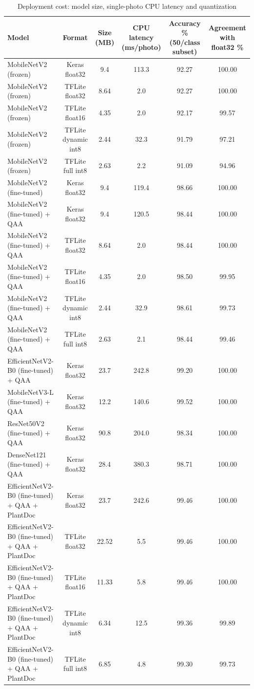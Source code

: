 \begin{table}[t]
\centering
\small
\caption{Deployment cost: model size, single-photo CPU latency and quantization}
\label{tab:table_deployment}
\begin{tabular}{lccccc}
\toprule
Model & Format & Size (MB) & CPU latency (ms/photo) & Accuracy \% (50/class subset) & Agreement with float32 \% \\
\midrule
MobileNetV2 (frozen) & Keras float32 & 9.4 & 113.3 & 92.27 & 100.00 \\
MobileNetV2 (frozen) & TFLite float32 & 8.64 & 2.0 & 92.27 & 100.00 \\
MobileNetV2 (frozen) & TFLite float16 & 4.35 & 2.0 & 92.17 & 99.57 \\
MobileNetV2 (frozen) & TFLite dynamic int8 & 2.44 & 32.3 & 91.79 & 97.21 \\
MobileNetV2 (frozen) & TFLite full int8 & 2.63 & 2.2 & 91.09 & 94.96 \\
MobileNetV2 (fine-tuned) & Keras float32 & 9.4 & 119.4 & 98.66 & 100.00 \\
MobileNetV2 (fine-tuned) + QAA & Keras float32 & 9.4 & 120.5 & 98.44 & 100.00 \\
MobileNetV2 (fine-tuned) + QAA & TFLite float32 & 8.64 & 2.0 & 98.44 & 100.00 \\
MobileNetV2 (fine-tuned) + QAA & TFLite float16 & 4.35 & 2.0 & 98.50 & 99.95 \\
MobileNetV2 (fine-tuned) + QAA & TFLite dynamic int8 & 2.44 & 32.9 & 98.61 & 99.73 \\
MobileNetV2 (fine-tuned) + QAA & TFLite full int8 & 2.63 & 2.1 & 98.44 & 99.46 \\
EfficientNetV2-B0 (fine-tuned) + QAA & Keras float32 & 23.7 & 242.8 & 99.20 & 100.00 \\
MobileNetV3-L (fine-tuned) + QAA & Keras float32 & 12.2 & 140.6 & 99.52 & 100.00 \\
ResNet50V2 (fine-tuned) + QAA & Keras float32 & 90.8 & 204.0 & 98.34 & 100.00 \\
DenseNet121 (fine-tuned) + QAA & Keras float32 & 28.4 & 380.3 & 98.71 & 100.00 \\
EfficientNetV2-B0 (fine-tuned) + QAA + PlantDoc & Keras float32 & 23.7 & 242.6 & 99.46 & 100.00 \\
EfficientNetV2-B0 (fine-tuned) + QAA + PlantDoc & TFLite float32 & 22.52 & 5.5 & 99.46 & 100.00 \\
EfficientNetV2-B0 (fine-tuned) + QAA + PlantDoc & TFLite float16 & 11.33 & 5.8 & 99.46 & 100.00 \\
EfficientNetV2-B0 (fine-tuned) + QAA + PlantDoc & TFLite dynamic int8 & 6.34 & 12.5 & 99.36 & 99.89 \\
EfficientNetV2-B0 (fine-tuned) + QAA + PlantDoc & TFLite full int8 & 6.85 & 4.8 & 99.30 & 99.73 \\
\bottomrule
\end{tabular}
\end{table}
